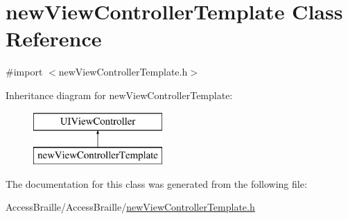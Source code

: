\hypertarget{interfacenew_view_controller_template}{\section{new\-View\-Controller\-Template Class Reference}
\label{interfacenew_view_controller_template}
}


{\ttfamily \#import $<$new\-View\-Controller\-Template.\-h$>$}

Inheritance diagram for new\-View\-Controller\-Template\-:\begin{figure}[H]
\begin{center}
\leavevmode
\includegraphics[height=2.000000cm]{interfacenew_view_controller_template}
\end{center}
\end{figure}


The documentation for this class was generated from the following file\-:\begin{DoxyCompactItemize}
\item 
Access\-Braille/\-Access\-Braille/\hyperlink{new_view_controller_template_8h}{new\-View\-Controller\-Template.\-h}\end{DoxyCompactItemize}
